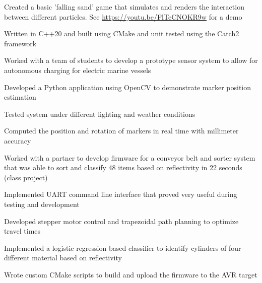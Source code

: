 
{Created a basic 'falling sand' game that simulates and renders the interaction between different particles. See \url{https://youtu.be/FlTeCNOKR9w} for a demo}{
    \item Written in C++20 and built using CMake and unit tested using the Catch2 framework
}

{Worked with a team of students to develop a prototype sensor system to allow for autonomous charging for electric marine vessels}{
    \item Developed a Python application using OpenCV to demonstrate marker position estimation
    \item Tested system under different lighting and weather conditions
    \item Computed the position and rotation of markers in real time with millimeter accuracy
}


{Worked with a partner to develop firmware for a conveyor belt and sorter system that was able to sort and classify 48 items based on reflectivity in 22 seconds (class project)}
{
    \item Implemented UART command line interface that proved very useful during testing and development
    \item Developed stepper motor control and trapezoidal path planning to optimize travel times
    \item Implemented a logistic regression based classifier to identify cylinders of four different material based on reflectivity
    \item Wrote custom CMake scripts to build and upload the firmware to the AVR target
}